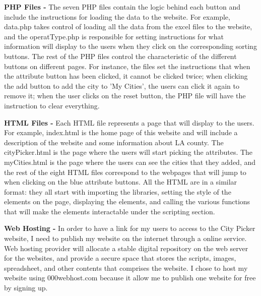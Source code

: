 \documentclass[10pt,twocolumn]{article}
\begin{document}
\textbf{PHP Files -}
The seven PHP files contain the logic behind each button and include the instructions for loading the data to the website. For example, data.php takes control of loading all the data from the excel files to the website, and the operatType.php is responsible for setting instructions for what information will display to the users when they click on the corresponding sorting buttons. The rest of the PHP files control the characteristic of the different buttons on different pages. For instance, the files set the instructions that when the attribute button has been clicked, it cannot be clicked twice; when clicking the add button to add the city to 'My Cities', the users can click it again to remove it; when the user clicks on the reset button, the PHP file will have the instruction to clear everything.

\textbf{HTML Files -}
Each HTML file represents a page that will display to the users. For example, index.html is the home page of this website and will include a description of the website and some information about LA county. The cityPicker.html is the page where the users will start picking the attributes. The myCities.html is the page where the users can see the cities that they added, and the rest of the eight HTML files correspond to the webpages that will jump to when clicking on the blue attribute buttons. All the HTML are in a similar format: they all start with importing the libraries, setting the style of the elements on the page, displaying the elements, and calling the various functions that will make the elements interactable under the scripting section.

\textbf{Web Hosting -}
In order to have a link for my users to access to the City Picker website, I need to publish my website on the internet through a online service. Web hosting provider will allocate a stable digital repository on the web server for the  websites, and provide a secure space that stores the scripts, images, spreadsheet, and other contents that comprises the website\cite{Pavlovic2020}. I chose to host my website using 000webhost.com because it allow me to publish one website for free by signing up.
\end{document}
